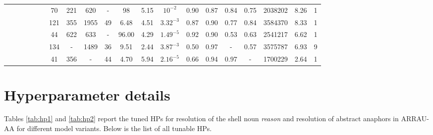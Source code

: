 \documentclass[11pt,letterpaper]{article}
\newcommand{\cmark}{\ding{51}}\newcommand{\xmark}{\ding{55}}
\begin{document}
\begin{table*}[t]
{\begin{tabular}{c|c|c|c|c|c|cccccccccccccc}
{\color{darkgreen} \cmark} & {\color{darkgreen} \cmark} & {\color{darkred} \xmark} & {\color{darkred} \xmark} & {\color{darkgreen} \cmark} & {\color{darkgreen} \cmark} & 70  & 221 & 620  & -   & 98    & 5.15 &  $10^{-2}$            & 0.90 & 0.87 & 0.84 & 0.75 & 2038202 & 8.26 & 1   \\

{\color{darkgreen} \cmark} & {\color{darkgreen} \cmark} & {\color{darkgreen} \cmark} & {\color{darkred} \xmark} & {\color{darkgreen} \cmark} & {\color{darkgreen} \cmark} &121 & 355 & 1955 & 49 & 6.48 & 4.51 & $3.32^{-3}$ & 0.87 & 0.90 & 0.77 & 0.84 & 3584370 & 8.33 & 1\\
{\color{darkred} \xmark} & {\color{darkred} \xmark} & {\color{darkred} \xmark} & {\color{darkred} \xmark} & {\color{darkgreen} \cmark} & {\color{darkgreen} \cmark} &  44  & 622 & 633  & -   & 96.00 & 4.29 & $1.49^{-5}$        & 0.92 & 0.90 & 0.53 & 0.63 & 2541217 & 6.62 & 1 \\

{\color{darkgreen} \cmark} & {\color{darkgreen} \cmark} & {\color{darkgreen} \cmark} & {\color{darkgreen} \cmark} & {\color{darkred} \xmark} & {\color{darkgreen} \cmark} & 134 & -   & 1489 & 36  & 9.51  & 2.44 & $3.87^{-3}$       & 0.50 & 0.97 & -    & 0.57 & 3575787 & 6.93 & 9    \\
{\color{darkgreen} \cmark} & {\color{darkgreen} \cmark} & {\color{darkgreen} \cmark} & {\color{darkgreen} \cmark} & {\color{darkgreen} \cmark} & {\color{darkred} \xmark} &  41  & 356 & -    & 44  & 4.70  & 5.94 & $2.16^{-5}$        & 0.66 & 0.94 & 0.97 & -    & 1700229 & 2.64 & 1  \\
\bottomrule
\end{tabular}
}
\caption{HPs used for evaluation on the ARRAU-AA test set.}
\label{tab:hp2}
\end{table*} 
\section{Hyperparameter details}

Tables \ref{tab:hp1} and \ref{tab:hp2} report the tuned HPs for resolution of the shell noun \textit{reason} and resolution of abstract anaphors in ARRAU-AA for different model variants. Below is the list of all tunable HPs.
\end{document}
